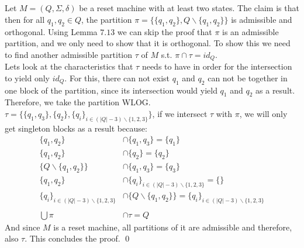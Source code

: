 \documentclass[a4paper,12pt,numbers=noenddot]{scrreport}
\begin{document}
\section{}
Let $M = (Q, \Sigma, \delta)$ be a reset machine with at least two states. The claim is that then for all $q_1, q_2 \in Q$, the partition $\pi = \{\{q_1, q_2\}, Q\backslash\{q_1, q_2\}\}$ is admissible and orthogonal.
Using Lemma $7.13$ we can skip the proof that $\pi$ is an admissible partition, and we only need to show that it is orthogonal. To show this we need to find another admissible partition $\tau$ of $M$ s.t. $\pi \cap \tau = id_Q$.\\
Lets look at the characteristics that $\tau$ needs to have in order for the intersection to yield only $id_Q$. For this, there can not exist $q_1$ and $q_2$ can not be together in one block of the partition, since its intersection would yield $q_1$ and $q_2$ as a result. Therefore, we take the partition WLOG. $\tau = \{\{q_1, q_3\}, \{q_2\}, \{q_i\}_{i \in (|Q| - 3)\backslash \{1,2,3\}}\}$, if we intersect $\tau$ with $\pi$, we will only get singleton blocks as a result because:
\begin{align*}
    \{q_1, q_2\}                                    &\cap \{q_1, q_3\} = \{q_1\} \\
    \{q_1, q_2\}                                    &\cap \{q_2\} = \{q_2\} \\
    \{Q\backslash\{q_1, q_2\}\}                     &\cap \{q_1, q_3\} = \{q_3\}\\ 
    \{q_1, q_2\}                                    &\cap \{q_i\}_{i \in (|Q| - 3)\backslash \{1,2,3\}} = \{\}\\
    \{q_i\}_{i \in (|Q| - 3)\backslash \{1,2,3\}}   &\cap \{Q\backslash\{q_1, q_2\}\} = \{q_i\}_{i \in (|Q| - 3)\backslash \{1,2,3\}}\\
    ~\\
    \bigcup \pi &\cap \tau = Q  
\end{align*}
And since $M$ is a reset machine, all partitions of it are admissible and therefore, also $\tau$. This concludes the proof.
\qed
\end{document}
